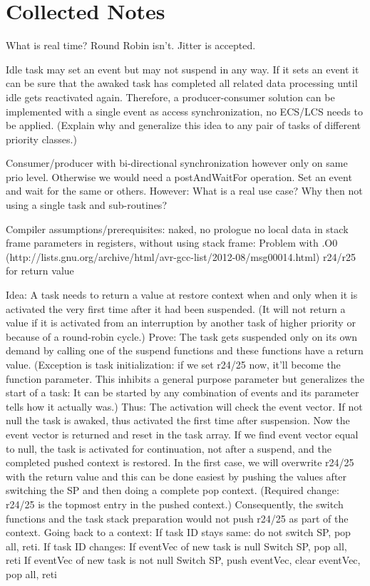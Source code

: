 
\chapter{Collected Notes}

What is real time? Round Robin isn't. Jitter is accepted.

Idle task may set an event but may not suspend in any way. If it sets an
event it can be sure that the awaked task has completed all related data
processing until idle gets reactivated again. Therefore, a
producer-consumer solution can be implemented with a single event as
access synchronization, no ECS/LCS needs to be applied. (Explain why and
generalize this idea to any pair of tasks of different priority classes.)

Consumer/producer with bi-directional synchronization however only on same
prio level. Otherwise we would need a postAndWaitFor operation. Set an
event and wait for the same or others. However: What is a real use case?
Why then not using a single task and sub-routines?

Compiler assumptions/prerequisites:
  naked, no prologue
  no local data in stack frame
  parameters in registers, without using stack frame: Problem with .O0 (http://lists.gnu.org/archive/html/avr-gcc-list/2012-08/msg00014.html)
  r24/r25 for return value 


    Idea: A task needs to return a value at restore context when and only when it is
    activated the very first time after it had been suspended. (It will not return a value
    if it is activated from an interruption by another task of higher priority or because
    of a round-robin cycle.) Prove: The
    task gets suspended only on its own demand by calling one of the suspend functions
    and these functions have a return value. (Exception is task initialization: if we set
    r24/25 now, it'll become the function parameter. This inhibits a general purpose
    parameter but generalizes the start of a task: It can be started by any combination of
    events and its parameter tells how it actually was.)
      Thus: The activation will check the event vector. If not null the task is awaked,
    thus activated the first time after suspension. Now the event vector is returned and
    reset in the task array. If we find event vector equal to null, the task is activated
    for continuation, not after a suspend, and the completed pushed context is restored.
      In the first case, we will overwrite r24/25 with the return value and this can be
    done easiest by pushing the values after switching the SP and then doing a complete pop
    context. (Required change: r24/25 is the topmost entry in the pushed context.)
    Consequently, the switch functions and the task stack preparation would not push r24/25
    as part of the context.
      Going back to a context:
    If task ID stays same: do not switch SP, pop all, reti.
    If task ID changes:
        If eventVec of new task is null
            Switch SP, pop all, reti
        If eventVec of new task is not null
            Switch SP, push eventVec, clear eventVec, pop all, reti


